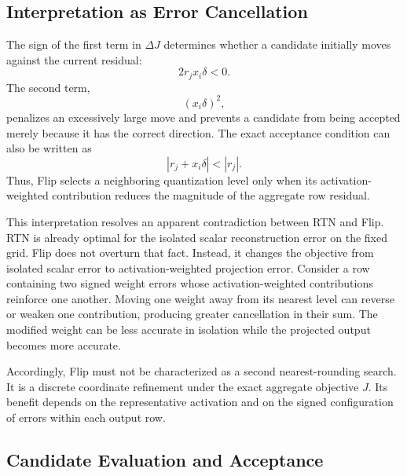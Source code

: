\subsection{Interpretation as Error Cancellation}

The sign of the first term in $\Delta J$ determines whether a candidate initially moves against the current residual:
\begin{equation}
2r_jx_i\delta<0.
\end{equation}
The second term,
\begin{equation}
(x_i\delta)^2,
\end{equation}
penalizes an excessively large move and prevents a candidate from being accepted merely because it has the correct direction. The exact acceptance condition can also be written as
\begin{equation}
|r_j+x_i\delta|<|r_j|.
\end{equation}
Thus, Flip selects a neighboring quantization level only when its activation-weighted contribution reduces the magnitude of the aggregate row residual.

This interpretation resolves an apparent contradiction between RTN and Flip. RTN is already optimal for the isolated scalar reconstruction error on the fixed grid. Flip does not overturn that fact. Instead, it changes the objective from isolated scalar error to activation-weighted projection error. Consider a row containing two signed weight errors whose activation-weighted contributions reinforce one another. Moving one weight away from its nearest level can reverse or weaken one contribution, producing greater cancellation in their sum. The modified weight can be less accurate in isolation while the projected output becomes more accurate.

Accordingly, Flip must not be characterized as a second nearest-rounding search. It is a discrete coordinate refinement under the exact aggregate objective $J$. Its benefit depends on the representative activation and on the signed configuration of errors within each output row.

\subsection{Candidate Evaluation and Acceptance}

